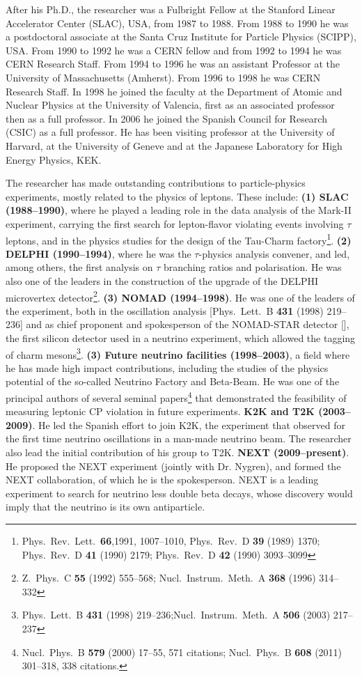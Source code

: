 After his Ph.D., the researcher was a Fulbright Fellow at the Stanford Linear Accelerator Center (SLAC), USA, from 1987 to 1988. From 1988 to 1990 he was a postdoctoral associate at the Santa Cruz Institute for Particle Physics (SCIPP), USA. From 1990 to 1992 he was a CERN fellow and from 1992 to 1994 he was CERN Research Staff. From 1994 to 1996 he was an assistant Professor at the University of Massachusetts (Amherst). From 1996 to 1998 he was CERN Research Staff. In 1998 he joined the faculty at the Department of Atomic and Nuclear Physics at the University of Valencia, first as an associated professor then as a full professor. In 2006 he joined the Spanish Council for Research (CSIC) as a full professor. He has been visiting professor at the University of Harvard, at the University of Geneve and at the Japanese Laboratory for High Energy Physics, KEK. 

The researcher has made outstanding contributions to particle-physics experiments, mostly related to the physics of leptons. These include:
%
{\bf (1) SLAC (1988--1990)}, where he played a leading role in the data analysis of the Mark-II experiment, carrying the first search for lepton-flavor violating events involving $\tau$ leptons, and in the physics studies for the design of the Tau-Charm factory\footnote{Phys.\ Rev.\ Lett.\ {\bf66},1991, 1007--1010, Phys.\ Rev.\ D {\bf39} (1989) 1370; Phys.\ Rev.\ D {\bf41} (1990) 2179; Phys.\ Rev.\ D {\bf42} (1990) 3093--3099}. 
{\bf (2) DELPHI (1990--1994)}, where he was the $\tau$-physics analysis convener, and led, among others, the first analysis on $\tau$ branching ratios and polarisation. He was also one of the leaders in the construction of the upgrade of the DELPHI microvertex detector\footnote{Z.\ Phys.\ C {\bf55} (1992) 555--568; Nucl.\ Instrum.\ Meth.\ A {\bf368} (1996) 314--332}. 
{\bf (3) NOMAD (1994--1998)}.  He was one of the leaders of the experiment, both in the oscillation analysis [Phys.\ Lett.\ B {\bf431} (1998) 219--236] and as chief proponent and spokesperson of the NOMAD-STAR detector [], the first silicon detector used in a neutrino experiment, which allowed the tagging of charm mesons\footnote{Phys.\ Lett.\ B {\bf431} (1998) 219--236;Nucl.\ Instrum.\ Meth.\ A {\bf506} (2003) 217--237}.
{\bf (3) Future neutrino facilities (1998--2003)}, a field where he has made 
high impact contributions, including the studies of the physics potential of the so-called Neutrino Factory and Beta-Beam. He was one of the principal authors of several seminal papers\footnote{Nucl.\ Phys.\ B {\bf579} (2000) 17--55, 571 citations; Nucl.\ Phys.\ B {\bf608} (2011) 301--318, 338 citations.} that demonstrated the feasibility of measuring leptonic CP violation in future experiments. 
{\bf K2K and T2K (2003--2009)}.  He led the Spanish effort to join K2K, the experiment that observed for the first time neutrino oscillations in a man-made neutrino beam.  The researcher also lead the initial contribution of his group to T2K.
{\bf NEXT (2009--present)}. He proposed the NEXT experiment (jointly with Dr. Nygren), and formed the NEXT collaboration, of which he is the spokesperson. NEXT is a leading experiment to search for neutrino less double beta decays, whose discovery would imply that the neutrino is its own antiparticle. 
